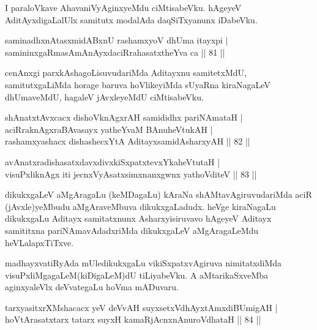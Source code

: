 \begin{artha}
I paraloVkave AhavaniVyAginxyeMdu ciMtisabeVku. hAgeyeV AditAyxdigaLalUlx samitutx modalAda daqSiTxyanunx iDabeVku.
\end{artha}

\begin{shl}
saminadhxnAtasxmidABxnU rashamxyoV dhUma itayxpi | \\
samininxgaRmasAmAnAyxdaciRrahasatxtheYva ca \hfill|| 81 || 
\end{shl}

\begin{artha}
cenAnxgi parxkAshagoLisuvudariMda Aditayxnu samitetxMdU, samitutxgaLiMda horage baruva hoVlikeyiMda sUyaRna kiraNagaLeV dhUmaveMdU, hagaleV jAvxleyeMdU ciMtisabeVku.
\end{artha}

\begin{shl}
shAnatxtAvxcacx dishoV\s knAgxrAH samididhx pariNAmataH | \\
aciRraknAgxraBAvasayx yatheYvaM BAnuheVtukAH | \\
rashamxyashacx dishashecxYtA AditayxsamidAsharxyAH \hfill|| 82 || 
\end{shl}

\begin{shl}
avAnatxradishasatxdavxdivxkiSxpatxtevxYkaheVtutaH | \\
visuPxliknAgx iti jecnxVyAsatxsimxnanxgwnx yathoVditeV \hfill|| 83 || 
\end{shl}

\begin{artha}
dikukxgaLeV aMgAragaLu (keMDagaLu) kAraNa shAMtavAgiruvudariMda aciR (jAvxle)yeMbudu aMgAraveMbuva dikukxgaLadudx. heVge kiraNagaLu dikukxgaLu Aditayx samitatxnunx Asharxyisiruvavo hAgeyeV Aditayx samititxna pariNAmavAdadxriMda dikukxgaLeV aMgAragaLeMdu heVLalapxTiTxve.

madhayxvatiRyAda mUledikukxgaLu vikiSxpatxvAgiruva nimitatxdiMda visuPx\-liMgagaLeM(kiDigaLeM)dU tiLiyabeVku. A aMtarikaSxveMba aginxyaleVlx deVvategaLu hoVma mADuvaru.
\end{artha}


\begin{shl}
\footnotemark[1]tarxyasitxrXMshacacx yeV deVvAH suyxsetxV\s dhAyxtAmxdiBUmigAH | \\
hoVtArasatxtarx tatarx suyxH kamaRjAcnxnAnuroVdhataH \hfill|| 84 || 
\end{shl}

